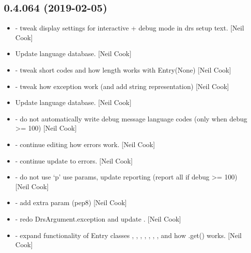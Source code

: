 \documentclass[a4paper,10pt,english]{report}
\begin{document}
\subsection{0.4.064 (2019-02-05)}
\label{\detokenize{misc/changelog:id194}}\begin{itemize}
\item {} 
 - tweak display settings for interactive + debug mode
in drs setup text. {[}Neil Cook{]}

\item {} 
Update language database. {[}Neil Cook{]}

\item {} 
 - tweak short codes and how length works with Entry(None)
{[}Neil Cook{]}

\item {} 
 - tweak how exception work (and add string
representation) {[}Neil Cook{]}

\item {} 
Update language database. {[}Neil Cook{]}

\item {} 
 - do not automatically write debug message language
codes (only when debug \textgreater{}= 100) {[}Neil Cook{]}

\item {} 
 - continue editing how errors work. {[}Neil Cook{]}

\item {} 
 - continue update to errors. {[}Neil Cook{]}

\item {} 
 - do not use ‘p’ use params, update reporting (report all
if debug \textgreater{}= 100) {[}Neil Cook{]}

\item {} 
 - add extra param (pep8) {[}Neil Cook{]}

\item {} 
 - redo DrsArgument.exception and update .
{[}Neil Cook{]}

\item {} 
 - expand functionality of Entry classes ,
, , , , , , 
and how .get() works. {[}Neil Cook{]}


\end{itemize}
\end{document}
